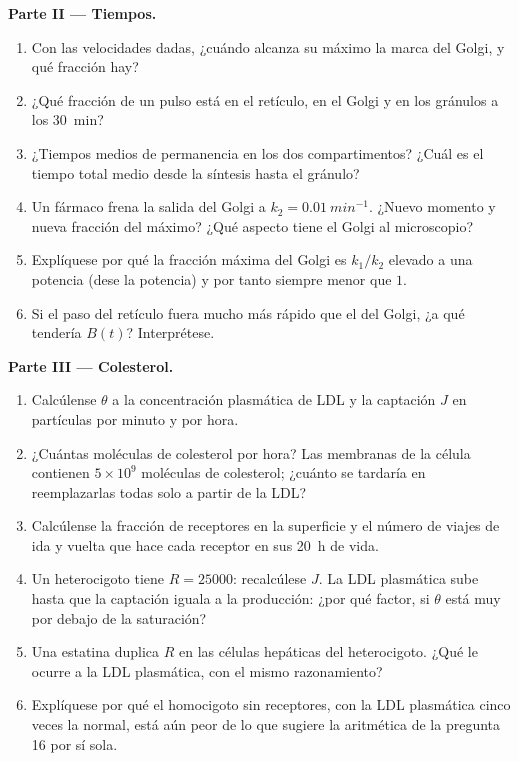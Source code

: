 \begin{problem}
\medskip
\noindent\textbf{Parte II --- Tiempos.}
\begin{enumerate}[resume]
  \item Con las velocidades dadas, ¿cuándo alcanza su máximo la marca
        del Golgi, y qué fracción hay?
  \item ¿Qué fracción de un pulso está en el retículo, en el Golgi y en
        los gránulos a los \qty{30}{min}?
  \item ¿Tiempos medios de permanencia en los dos compartimentos? ¿Cuál
        es el tiempo total medio desde la síntesis hasta el gránulo?
  \item Un fármaco frena la salida del Golgi a
        $k_{2} = \qty{0.01}{min^{-1}}$. ¿Nuevo momento y nueva fracción
        del máximo? ¿Qué aspecto tiene el Golgi al microscopio?
  \item Explíquese por qué la fracción máxima del Golgi es
        $k_{1}/k_{2}$ elevado a una potencia (dese la potencia) y por
        tanto siempre menor que $1$.
  \item Si el paso del retículo fuera mucho más rápido que el del
        Golgi, ¿a qué tendería $B(t)$? Interprétese.
\end{enumerate}

\medskip
\noindent\textbf{Parte III --- Colesterol.}
\begin{enumerate}[resume]
  \item Calcúlense $\theta$ a la concentración plasmática de LDL y la
        captación $J$ en partículas por minuto y por hora.
  \item ¿Cuántas moléculas de colesterol por hora? Las membranas de la
        célula contienen $5\times 10^{9}$ moléculas de colesterol;
        ¿cuánto se tardaría en reemplazarlas todas solo a partir de la
        LDL?
  \item Calcúlense la fracción de receptores en la superficie y el
        número de viajes de ida y vuelta que hace cada receptor en sus
        \qty{20}{h} de vida.
  \item Un heterocigoto tiene $R = \num{25000}$: recalcúlese $J$. La LDL
        plasmática sube hasta que la captación iguala a la producción:
        ¿por qué factor, si $\theta$ está muy por debajo de la
        saturación?
  \item Una estatina duplica $R$ en las células hepáticas del
        heterocigoto. ¿Qué le ocurre a la LDL plasmática, con el mismo
        razonamiento?
  \item Explíquese por qué el homocigoto sin receptores, con la LDL
        plasmática cinco veces la normal, está aún peor de lo que
        sugiere la aritmética de la pregunta 16 por sí sola.
\end{enumerate}


\end{problem}
